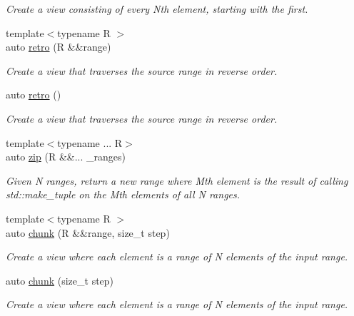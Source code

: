 \begin{DoxyCompactItemize}
\begin{DoxyCompactList}\small\item\em Create a view consisting of every Nth element, starting with the first. \end{DoxyCompactList}\item 
{\footnotesize template$<$typename R $>$ }\\auto \mbox{\hyperlink{namespacerah_1_1view_a9f47b2859b0a8a7e136f09d5c33b89e6}{retro}} (R \&\&range)
\begin{DoxyCompactList}\small\item\em Create a view that traverses the source range in reverse order. \end{DoxyCompactList}\item 
auto \mbox{\hyperlink{namespacerah_1_1view_a8cafe11e62b8f98833a9172cc803f116}{retro}} ()
\begin{DoxyCompactList}\small\item\em Create a view that traverses the source range in reverse order. \end{DoxyCompactList}\item 
{\footnotesize template$<$typename ... R$>$ }\\auto \mbox{\hyperlink{namespacerah_1_1view_a5b9cacbf101962d95221b591d7f11026}{zip}} (R \&\&... \+\_\+ranges)
\begin{DoxyCompactList}\small\item\em Given N ranges, return a new range where Mth element is the result of calling std\+::make\+\_\+tuple on the Mth elements of all N ranges. \end{DoxyCompactList}\item 
{\footnotesize template$<$typename R $>$ }\\auto \mbox{\hyperlink{namespacerah_1_1view_a2859e5c6e21d7a2bf9e188539602daa7}{chunk}} (R \&\&range, size\+\_\+t step)
\begin{DoxyCompactList}\small\item\em Create a view where each element is a range of N elements of the input range. \end{DoxyCompactList}\item 
auto \mbox{\hyperlink{namespacerah_1_1view_a5b3a70ad1a0373e8fadbfa26a9676077}{chunk}} (size\+\_\+t step)
\begin{DoxyCompactList}\small\item\em Create a view where each element is a range of N elements of the input range. \end{DoxyCompactList}\item 

\end{DoxyCompactItemize}
